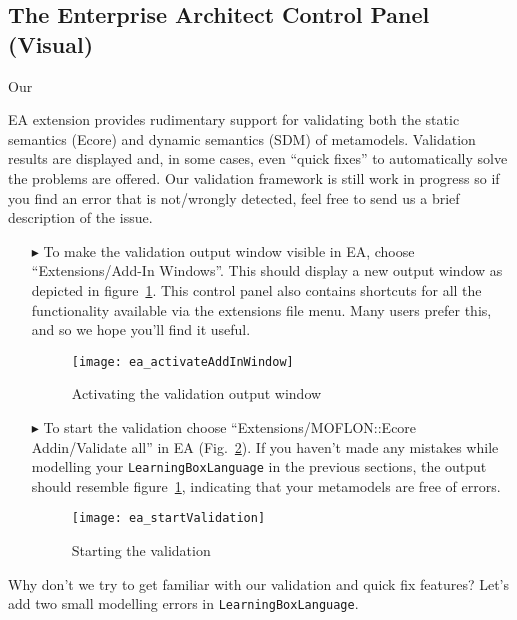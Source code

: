\visHeader
\subsection{The Enterprise Architect Control Panel (Visual) }

\hypertarget{validation vis}{Our} EA extension provides rudimentary support for validating both the static semantics (Ecore) and dynamic semantics (SDM) of metamodels.
Validation results are displayed and, in some cases, even ``quick fixes'' to automatically solve the problems are offered.
Our validation framework is still work in progress so if you find an error that is not/wrongly detected, feel free to send us a brief description of the issue.

\begin{enumerate}
\item[$\blacktriangleright$] To make the validation output window visible in EA, choose ``Extensions/\-Add-In Windows''.
This should display a new output window as depicted in figure~\ref{fig:validation_output}. This control panel also contains shortcuts for all the functionality available via the extensions file menu. Many users prefer this, and so we hope you'll find it useful.

\begin{figure}[htbp]
	\centering
  \texttt{[image: ea\_activateAddInWindow]}
	\caption{Activating the validation output window}
	\label{fig:validation_output}
\end{figure}
\FloatBarrier

\item[$\blacktriangleright$] To start the validation choose ``Extensions/\-MOFLON::Ecore Addin/\-Validate all'' in EA (Fig.~\ref{fig:validation_menu}).
If you haven't made any mistakes while modelling your \texttt{LearningBoxLanguage} in the previous sections, the output should resemble figure~\ref{fig:validation_output}, indicating that your metamodels are free of errors.

\begin{figure}[htbp]
	\centering
  \texttt{[image: ea\_startValidation]}
	\caption{Starting the validation}
	\label{fig:validation_menu}
\end{figure}
\FloatBarrier
\end{enumerate}


Why don't we try to get familiar with our validation and quick fix features? Let's add two small modelling errors in \texttt{LearningBoxLanguage}.

